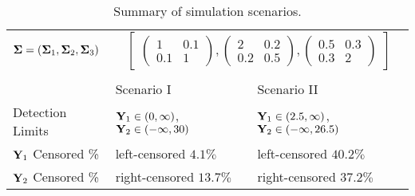 \documentclass{interact}
\theoremstyle{plain}
\theoremstyle{definition}
\theoremstyle{remark}
\begin{document}
\begin{table}[h!]
\begin{tabular}{ |p{4cm}||p{5.5cm}|p{6cm}|}
    $\bm{\Sigma}=(\bm{\Sigma}_1,\bm{\Sigma}_2,\bm{\Sigma}_3)$   &\multicolumn{2}{|c|}{
            $\begin{bmatrix} \begin{pmatrix}
                    1   & 0.1\\
                    0.1 & 1
            \end{pmatrix},
            \begin{pmatrix}
            2 & 0.2\\
            0.2 & 0.5
            \end{pmatrix},
            \begin{pmatrix}
            0.5 & 0.3\\
            0.3   & 2            \end{pmatrix}\end{bmatrix}$}\\
            \\
    \hline
    & Scenario I & Scenario II\\
    \hline
    Detection Limits & $\mathbf{Y}_1\in(0,\infty)$, $\mathbf{Y}_2 \in (-\infty,30)$ & $\mathbf{Y}_1 \in (2.5,\infty)$, $\mathbf{Y}_2 \in (-\infty,26.5)$\\
    \hline
    $\mathbf{Y}_1$ Censored \% & left-censored $4.1\%$ & left-censored $40.2\%$\\
    \hline
    $\mathbf{Y}_2$ Censored \% & right-censored $13.7\%$ & right-censored $37.2\%$\\
    \hline
    \end{tabular}
    \caption{Summary of simulation scenarios.}\label{Supplement:Table.1}
\end{table}

\pagebreak
\end{document}
